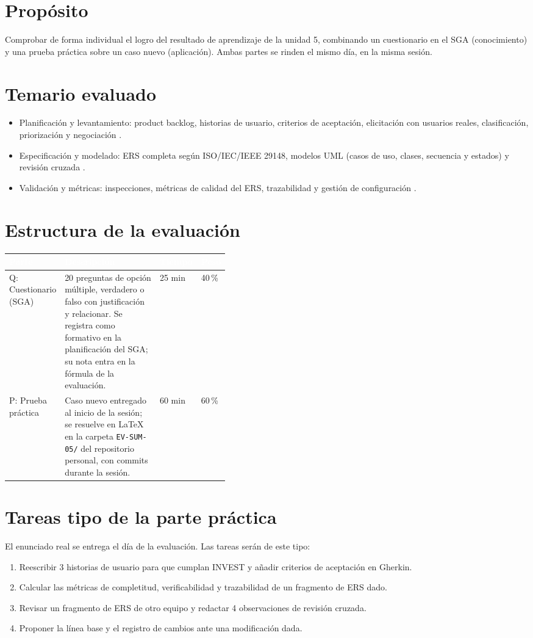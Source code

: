 \documentclass[11pt]{article}
\newcommand{\thdr}[1]{\cellcolor{utegreen}\textcolor{white}{\textbf{#1}}}
\newcommand{\seccion}[1]{\section{\textcolor{utegreendk}{#1}}}
\begin{document}
\seccion{Propósito}

Comprobar de forma individual el logro del resultado de aprendizaje de la unidad 5, combinando un cuestionario en el SGA (conocimiento) y una prueba práctica sobre un caso nuevo (aplicación). Ambas partes se rinden el mismo día, en la misma sesión.

\seccion{Temario evaluado}

\begin{itemize}[leftmargin=20pt,itemsep=2pt]
	\item Planificación y levantamiento: product backlog, historias de usuario, criterios de aceptación, elicitación con usuarios reales, clasificación, priorización y negociación \citep{scrumguide_2020}.
	\item Especificación y modelado: ERS completa según ISO/\allowbreak{}IEC/\allowbreak{}IEEE 29148, modelos UML (casos de uso, clases, secuencia y estados) y revisión cruzada \citep{iso29148_2018,omg_uml_2017}.
	\item Validación y métricas: inspecciones, métricas de calidad del ERS, trazabilidad y gestión de configuración \citep{iso25010_2023}.
\end{itemize}

\seccion{Estructura de la evaluación}

\noindent\begin{tabularx}{\linewidth}{|L{0.20\linewidth}|Y|C{0.12\linewidth}|C{0.10\linewidth}|}
	\hline
	\thdr{Parte} & \thdr{Descripción} & \thdr{Tiempo} & \thdr{Peso}\\
	\hline
	Q: Cuestionario (SGA) & 20 preguntas de opción múltiple, verdadero o falso con justificación y relacionar. Se registra como formativo en la planificación del SGA; su nota entra en la fórmula de la evaluación. & 25 min & 40\,\%\\
	\hline
	 P: Prueba práctica & Caso nuevo entregado al inicio de la sesión; se resuelve en \LaTeX{} en la carpeta \texttt{EV-SUM-05/} del repositorio personal, con commits durante la sesión. & 60 min & 60\,\%\\
	\hline
\end{tabularx}

\seccion{Tareas tipo de la parte práctica}

El enunciado real se entrega el día de la evaluación. Las tareas serán de este tipo:

\begin{enumerate}[leftmargin=20pt,itemsep=2pt]
	\item Reescribir 3 historias de usuario para que cumplan INVEST y añadir criterios de aceptación en Gherkin.
	\item Calcular las métricas de completitud, verificabilidad y trazabilidad de un fragmento de ERS dado.
	\item Revisar un fragmento de ERS de otro equipo y redactar 4 observaciones de revisión cruzada.
	\item Proponer la línea base y el registro de cambios ante una modificación dada.
\end{enumerate}
\end{document}
